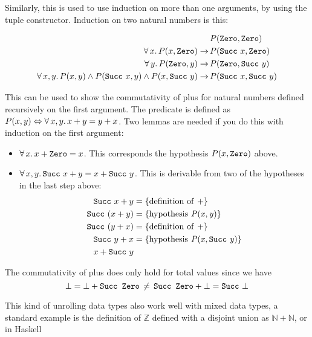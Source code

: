 Similarly, this is used to use induction on more than one arguments,
by using the tuple constructor. Induction on two natural numbers is this:

\begin{align*}
                                                                                       & P(\hs{Zero}     ,\hs{Zero}     ) \\
\fa{x} P(x,\hs{Zero})                                                   \rightarrow \, & P(\hs{Succ} \w x,\hs{Zero}     ) \\
\fa{y} P(\hs{Zero},y)                                                   \rightarrow \, & P(\hs{Zero}     ,\hs{Succ} \w y) \\
\faa{x}{y} P(x,y) \wedge P(\hs{Succ} \w x,y) \wedge P(x,\hs{Succ} \w y) \rightarrow \, & P(\hs{Succ} \w x,\hs{Succ} \w y) \\
\end{align*}

This can be used to show the commutativity of plus for natural numbers
defined recursively on the first argument. The predicate is defined as
$P(x,y) \Leftrightarrow \forall \, x , y . \, x + y = y + x$. Two lemmas are
needed if you do this with induction on the first argument:
\begin{itemize}
  \item $\fa{x} x + \hs{Zero} = x$. This corresponds the hypothesis
    $P(x,\hs{Zero})$ above.
  \item $\faa{x}{y} \hs{Succ} \w x + y = x + \hs{Succ} \w y$. This is
    derivable from two of the hypotheses in the last step above:
    \begin{align*}
    \hs{Succ} \w x + y   & = \{\mathrm{definition \w of \w \mathit{+}}\} \\
    \hs{Succ} \w (x + y) & = \{\mathrm{hypothesis \w \mathit{P(x,y)}}\} \\
    \hs{Succ} \w (y + x) & = \{\mathrm{definition \w of \w \mathit{+}}\} \\
    \hs{Succ} \w y + x   & = \{\mathrm{hypothesis \w \mathit{P(x,\hs{Succ} \w y)}}\} \\
    x + \hs{Succ} \w y
    \end{align*}
\end{itemize}

The commutativity of plus does only hold for total values since we have
$$\bot \eq \bot + \hs{Succ Zero} \, \neq \, \hs{Succ Zero} + \bot \eq \hs{Succ} \w \bot$$

This kind of unrolling data types also work well with mixed data
types, a standard example is the definition of $\mathbb{Z}$ defined
with a disjoint union as $\mathbb{N} + \mathbb{N}$, or in Haskell

